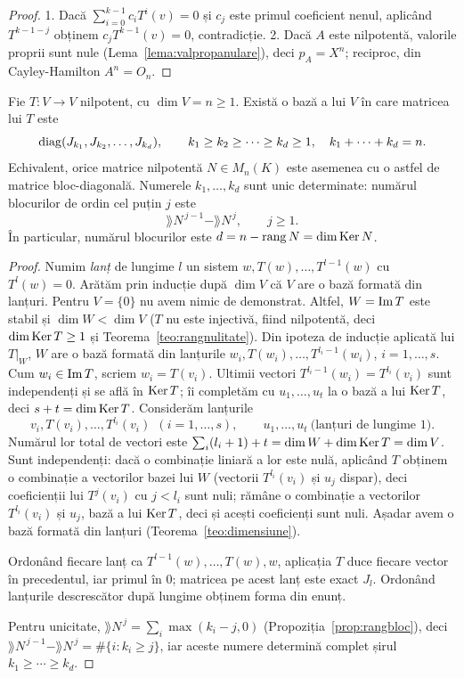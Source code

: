 \begin{proof}
1. Dacă $\sum_{i=0}^{k-1}c_iT^i(v)=0$ și $c_j$ este primul coeficient nenul, aplicând $T^{k-1-j}$ obținem $c_jT^{k-1}(v)=0$, contradicție.
2. Dacă $A$ este nilpotentă, valorile proprii sunt nule (Lema~\ref{lema:valpropanulare}), deci $p_A=X^n$; reciproc, din Cayley-Hamilton $A^n=O_n$.
\end{proof}

\begin{teorema}\label{teo:jordannilpotent}
Fie $T:V\to V$ nilpotent, cu $\dim V=n\ge1$. Există o bază a lui $V$ în care matricea lui $T$ este
\[
\operatorname{diag}(J_{k_1},J_{k_2},\dots,J_{k_d}),\qquad k_1\ge k_2\ge\cdots\ge k_d\ge1,\quad k_1+\cdots+k_d=n .
\]
Echivalent, orice matrice nilpotentă $N\in M_n(K)$ este asemenea cu o astfel de matrice bloc-diagonală. Numerele $k_1,\dots,k_d$ sunt unic determinate: numărul blocurilor de ordin cel puțin $j$ este
\[
\rang N^{\,j-1}-\rang N^{\,j},\qquad j\ge1 .
\]
În particular, numărul blocurilor este $d=n-\operatorname{rang} N=\dim\operatorname{Ker} N$.
\end{teorema}

\begin{proof}
Numim \emph{lanț} de lungime $l$ un sistem $w,T(w),\dots,T^{l-1}(w)$ cu $T^l(w)=0$. Arătăm prin inducție după $\dim V$ că $V$ are o bază formată din lanțuri. Pentru $V=\{0\}$ nu avem nimic de demonstrat. Altfel, $W=\operatorname{Im} T$ este stabil și $\dim W<\dim V$ ($T$ nu este injectivă, fiind nilpotentă, deci $\dim\operatorname{Ker} T\ge1$ și Teorema~\ref{teo:rangnulitate}). Din ipoteza de inducție aplicată lui $T|_W$, $W$ are o bază formată din lanțurile $w_i,T(w_i),\dots,T^{l_i-1}(w_i)$, $i=1,\dots,s$. Cum $w_i\in\operatorname{Im} T$, scriem $w_i=T(v_i)$. Ultimii vectori $T^{l_i-1}(w_i)=T^{l_i}(v_i)$ sunt independenți și se află în $\operatorname{Ker} T$; îi completăm cu $u_1,\dots,u_t$ la o bază a lui $\operatorname{Ker} T$, deci $s+t=\dim\operatorname{Ker} T$. Considerăm lanțurile
\[
v_i,T(v_i),\dots,T^{l_i}(v_i)\ \ (i=1,\dots,s),\qquad u_1,\dots,u_t\ \text{(lanțuri de lungime $1$)}.
\]
Numărul lor total de vectori este $\sum_i(l_i+1)+t=\dim W+\dim\operatorname{Ker} T=\dim V$. Sunt independenți: dacă o combinație liniară a lor este nulă, aplicând $T$ obținem o combinație a vectorilor bazei lui $W$ (vectorii $T^{l_i}(v_i)$ și $u_j$ dispar), deci coeficienții lui $T^j(v_i)$ cu $j<l_i$ sunt nuli; rămâne o combinație a vectorilor $T^{l_i}(v_i)$ și $u_j$, bază a lui $\operatorname{Ker} T$, deci și acești coeficienți sunt nuli. Așadar avem o bază formată din lanțuri (Teorema~\ref{teo:dimensiune}).

Ordonând fiecare lanț ca $T^{l-1}(w),\dots,T(w),w$, aplicația $T$ duce fiecare vector în precedentul, iar primul în $0$; matricea pe acest lanț este exact $J_l$. Ordonând lanțurile descrescător după lungime obținem forma din enunț.

Pentru unicitate, $\rang N^{\,j}=\sum_i\max(k_i-j,0)$ (Propoziția~\ref{prop:rangbloc}), deci $\rang N^{\,j-1}-\rang N^{\,j}=\#\{i:k_i\ge j\}$, iar aceste numere determină complet șirul $k_1\ge\cdots\ge k_d$.
\end{proof}

